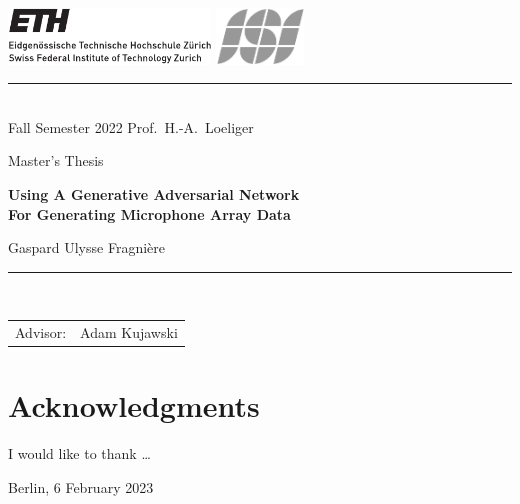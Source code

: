 \documentclass[11pt,a4paper,twoside]{report}
\begin{document}
\pagestyle{plain}
\lfoot{}
\cfoot{\thepage}
\rfoot{}
     
\begin{titlepage}
  \begin{center}
    \includegraphics[height=15mm]{resources/ethlogo} 
    \hfill
    \includegraphics[height=15mm]{resources/isilogo_plain_bw}

    \rule{\textwidth}{0.5pt}\\[1ex]
    {\Large Fall Semester 2022 \hfill 
      Prof.~H.-A.~Loeliger
    }

    \LARGE
    Master's Thesis

    \Huge\textbf{
      Using A Generative Adversarial Network\\
      For Generating Microphone Array Data
    }
    
    \LARGE{
      Gaspard Ulysse Fragnière
    }
    
  \end{center}
  \rule{\textwidth}{0.5pt}\\[2ex]
  \noindent
  \begin{tabular}{@{}ll@{}}
    \Large Advisor: & \Large Adam Kujawski\\[1ex]
  \end{tabular}
\end{titlepage}


\chapter*{Acknowledgments}
I would like to thank \ldots


\vspace{11mm}
\noindent
Berlin, 6 February 2023
\end{document}
